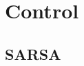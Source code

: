\documentclass[10pt, envcountsect, handout, aspectratio=1610, hyperref={hypertexnames=true}]{beamer}
\begin{document}

\section{Control}


\subsection{SARSA}

\end{document}
